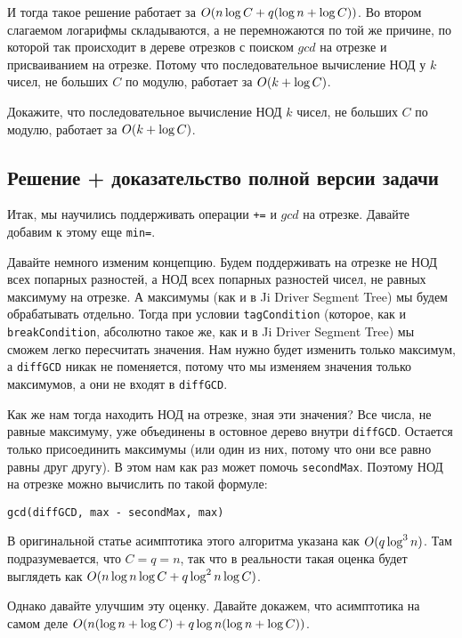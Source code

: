 И тогда такое решение работает за $O(n \log C + q (\log n +  \log C))$. Во втором слагаемом логарифмы складываются, а не перемножаются по той же причине, по которой так происходит в дереве отрезков с поиском $gcd$ на отрезке и присваиванием на отрезке. Потому что последовательное вычисление НОД у $k$ чисел, не больших $C$ по модулю, работает за $O(k + \log C)$.

\begin{exercise}
    Докажите, что последовательное вычисление НОД $k$ чисел, не больших $C$ по модулю, работает за $O(k + \log C)$.
\end{exercise}


\subsection{Решение + доказательство полной версии задачи}

Итак, мы научились поддерживать операции \verb^+=^ и $gcd$ на отрезке. Давайте добавим к этому еще \verb+min=+.

Давайте немного изменим концепцию. Будем поддерживать на отрезке не НОД всех попарных разностей, а НОД всех попарных разностей чисел, не равных максимуму на отрезке. А максимумы (как и в Ji Driver Segment Tree) мы будем обрабатывать отдельно. Тогда при условии \verb+tagCondition+ (которое, как и \verb+breakCondition+, абсолютно такое же, как и в Ji Driver Segment Tree) мы сможем легко пересчитать значения. Нам нужно будет изменить только максимум, а \verb+diffGCD+ никак не поменяется, потому что мы изменяем значения только максимумов, а они не входят в \verb+diffGCD+.

Как же нам тогда находить НОД на отрезке, зная эти значения? Все числа, не равные максимуму, уже объединены в остовное дерево внутри \verb+diffGCD+. Остается только присоединить максимумы (или один из них, потому что они все равно равны друг другу). В этом нам как раз может помочь \verb+secondMax+. Поэтому НОД на отрезке можно вычислить по такой формуле:

\verb+gcd(diffGCD, max - secondMax, max)+


В оригинальной статье асимптотика этого алгоритма указана как $O(q \log^3 n)$. Там подразумевается, что $C = q = n$, так что в реальности такая оценка будет выглядеть как $O(n \log n \log C + q \log^2 n \log C)$.

Однако давайте улучшим эту оценку. Давайте докажем, что асимптотика на самом деле $O(n (\log n + \log C) + q \log n (\log n + \log C))$.

